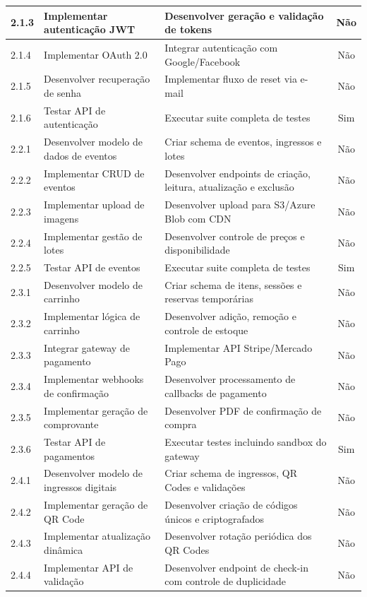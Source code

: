 \begin{table}[H]
\begin{tabular}{|p{0.9cm}|p{6.2cm}|p{5.7cm}|c|}
2.1.3 & Implementar autenticação JWT & Desenvolver geração e validação de tokens & Não \\ \hline
2.1.4 & Implementar OAuth 2.0 & Integrar autenticação com Google/Facebook & Não \\ \hline
2.1.5 & Desenvolver recuperação de senha & Implementar fluxo de reset via e-mail & Não \\ \hline
2.1.6 & Testar API de autenticação & Executar suite completa de testes & Sim \\ \hline
2.2.1 & Desenvolver modelo de dados de eventos & Criar schema de eventos, ingressos e lotes & Não \\ \hline
2.2.2 & Implementar CRUD de eventos & Desenvolver endpoints de criação, leitura, atualização e exclusão & Não \\ \hline
2.2.3 & Implementar upload de imagens & Desenvolver upload para S3/Azure Blob com CDN & Não \\ \hline
2.2.4 & Implementar gestão de lotes & Desenvolver controle de preços e disponibilidade & Não \\ \hline
2.2.5 & Testar API de eventos & Executar suite completa de testes & Sim \\ \hline
2.3.1 & Desenvolver modelo de carrinho & Criar schema de itens, sessões e reservas temporárias & Não \\ \hline
2.3.2 & Implementar lógica de carrinho & Desenvolver adição, remoção e controle de estoque & Não \\ \hline
2.3.3 & Integrar gateway de pagamento & Implementar API Stripe/Mercado Pago & Não \\ \hline
2.3.4 & Implementar webhooks de confirmação & Desenvolver processamento de callbacks de pagamento & Não \\ \hline
2.3.5 & Implementar geração de comprovante & Desenvolver PDF de confirmação de compra & Não \\ \hline
2.3.6 & Testar API de pagamentos & Executar testes incluindo sandbox do gateway & Sim \\ \hline
2.4.1 & Desenvolver modelo de ingressos digitais & Criar schema de ingressos, QR Codes e validações & Não \\ \hline
2.4.2 & Implementar geração de QR Code & Desenvolver criação de códigos únicos e criptografados & Não \\ \hline
2.4.3 & Implementar atualização dinâmica & Desenvolver rotação periódica dos QR Codes & Não \\ \hline
2.4.4 & Implementar API de validação & Desenvolver endpoint de check-in com controle de duplicidade & Não \\ \hline

\end{tabular}
\end{table}
